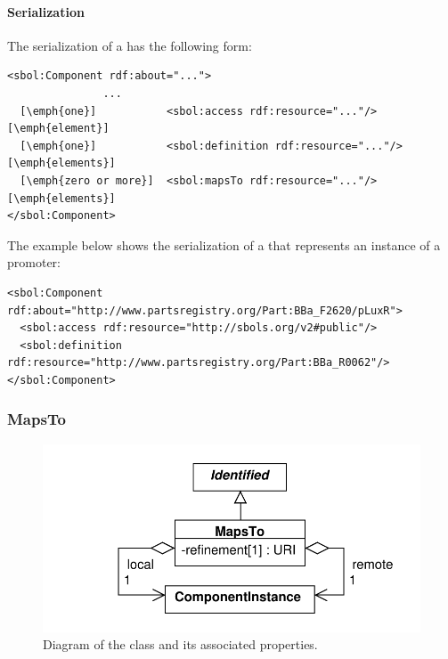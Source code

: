 
\paragraph{Serialization}

The serialization of a  has the following form:

\begin{lstlisting}
<sbol:Component rdf:about="...">
               ...
  [\emph{one}]           <sbol:access rdf:resource="..."/> [\emph{element}]
  [\emph{one}]           <sbol:definition rdf:resource="..."/> [\emph{elements}]    
  [\emph{zero or more}]  <sbol:mapsTo rdf:resource="..."/> [\emph{elements}]
</sbol:Component>
\end{lstlisting}

The example below shows the serialization of a 
that represents an instance of a promoter:

\begin{lstlisting}
<sbol:Component rdf:about="http://www.partsregistry.org/Part:BBa_F2620/pLuxR">
  <sbol:access rdf:resource="http://sbols.org/v2#public"/>
  <sbol:definition rdf:resource="http://www.partsregistry.org/Part:BBa_R0062"/>
</sbol:Component>
\end{lstlisting}



\subsubsection{MapsTo}
\label{sec:MapsTo}

\begin{figure}[ht]
\begin{center}
\includegraphics[scale=0.6]{uml/maps_to}
\caption[]{Diagram of the  class and its associated properties.}
\label{uml:maps_to}
\end{center}
\end{figure}

